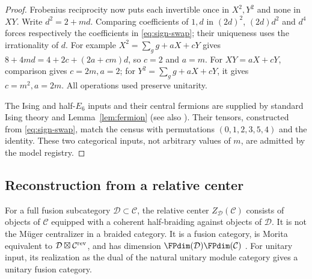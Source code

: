 \begin{proof}
Frobenius reciprocity now puts each invertible once in $X^2,Y^2$ and none
in $XY$. Write $d^2=2+md$. Comparing coefficients of $1,d$ in
$(2d)^2$, $(2d)d^2$ and $d^4$ forces respectively the coefficients in
\eqref{eq:sign-swap}; their uniqueness uses the irrationality of $d$.
For example $X^2=\sum_g g+aX+cY$ gives $8+4md=4+2c+(2a+cm)d$,
so $c=2$ and $a=m$. For $XY=aX+cY$, comparison gives $c=2m,a=2$;
for $Y^2=\sum_g g+aX+cY$, it gives $c=m^2,a=2m$.
All operations used preserve unitarity.

The Ising and half-$E_6$ inputs and their central fermions are supplied by
standard Ising theory and Lemma~\ref{lem:fermion} (see also \cite{ALW}).
Their tensors, constructed from \eqref{eq:sign-swap}, match the census
with permutations $(0,1,2,3,5,4)$ and the identity. These two categorical
inputs, not arbitrary values of $m$, are admitted by the model registry.
\end{proof}

\subsection{Reconstruction from a relative center}\label{sec:relative-fibonacci}
For a full fusion subcategory $\mathcal D\subset\mathcal C$, the relative
center $Z_{\mathcal D}(\mathcal C)$ consists of objects of $\mathcal C$
equipped with a coherent half-braiding against objects of $\mathcal D$.
It is not the M\"uger centralizer in a braided category. It is a fusion
category, is Morita equivalent to $\mathcal D\boxtimes\mathcal C^{\rm rev}$,
and has dimension $\FPdim(\mathcal D)\FPdim(\mathcal C)$
\cite[Remark~2.4]{GNNrel}. For unitary input, its realization as the dual
of the natural unitary module category gives a unitary fusion category.

